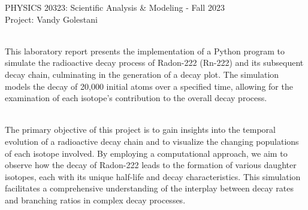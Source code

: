 \documentclass[12pt]{article}
\begin{document}
\def\pos{\medskip\quad}
\def\subpos{\smallskip \qquad}

\begin{center}
{\large
PHYSICS  20323: Scientific Analysis \& Modeling - Fall 2023
}\\
{\large Project: Vandy Golestani}\\\vskip0.25in
\end{center}
 \\

This laboratory report presents the implementation of a Python program to simulate the radioactive decay process of Radon-222 (Rn-222) and its subsequent decay chain, culminating in the generation of a decay plot. The simulation models the decay of 20,000 initial atoms over a specified time, allowing for the examination of each isotope's contribution to the overall decay process.

\vskip0.1in
 \\

The primary objective of this project is to gain insights into the temporal evolution of a radioactive decay chain and to visualize the changing populations of each isotope involved. By employing a computational approach, we aim to observe how the decay of Radon-222 leads to the formation of various daughter isotopes, each with its unique half-life and decay characteristics. This simulation facilitates a comprehensive understanding of the interplay between decay rates and branching ratios in complex decay processes.




\end{document}
